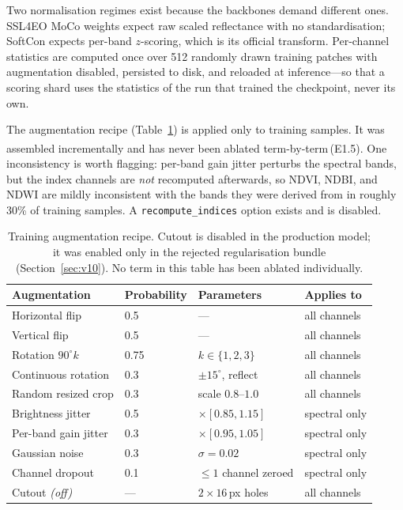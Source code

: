 \documentclass[11pt,a4paper]{article}
\newcommand{\code}[1]{\texttt{\small #1}}
\newcommand{\unablated}[1]{\textsuperscript{\dag}\,(#1)}
\begin{document}
Two normalisation regimes exist because the backbones demand different ones.
SSL4EO MoCo weights expect raw scaled reflectance with no standardisation;
SoftCon expects per-band \(z\)-scoring, which is its official transform. Per-channel
statistics are computed once over 512 randomly drawn training patches with
augmentation disabled, persisted to disk, and reloaded at inference---so that a
scoring shard uses the statistics of the run that trained the checkpoint, never
its own.

The augmentation recipe (Table~\ref{tab:augs}) is applied only to training
samples. It was assembled incrementally and has never been ablated
term-by-term\unablated{E1.5}. One inconsistency is worth flagging: per-band gain
jitter perturbs the spectral bands, but the index channels are \emph{not}
recomputed afterwards, so NDVI, NDBI, and NDWI are mildly inconsistent with the
bands they were derived from in roughly 30\% of training samples. A
\code{recompute\_indices} option exists and is disabled.

\begin{table}[t]
\centering
\small
\caption{Training augmentation recipe. Cutout is disabled in the production
model; it was enabled only in the rejected regularisation bundle
(Section~\ref{sec:v10}). No term in this table has been ablated individually.}
\label{tab:augs}
\begin{tabular}{llll}
\toprule
Augmentation & Probability & Parameters & Applies to \\
\midrule
Horizontal flip        & 0.5  & ---                       & all channels \\
Vertical flip          & 0.5  & ---                       & all channels \\
Rotation $90^\circ k$  & 0.75 & $k \in \{1,2,3\}$         & all channels \\
Continuous rotation    & 0.3  & $\pm 15^\circ$, reflect   & all channels \\
Random resized crop    & 0.3  & scale $0.8$--$1.0$        & all channels \\
Brightness jitter      & 0.5  & $\times[0.85, 1.15]$      & spectral only \\
Per-band gain jitter   & 0.3  & $\times[0.95, 1.05]$      & spectral only \\
Gaussian noise         & 0.3  & $\sigma = 0.02$           & spectral only \\
Channel dropout        & 0.1  & $\leq 1$ channel zeroed   & spectral only \\
Cutout \emph{(off)}    & ---  & $2 \times 16$\,px holes   & all channels \\
\bottomrule
\end{tabular}
\end{table}
\end{document}
